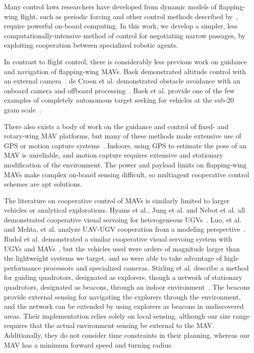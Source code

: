 \documentclass{aamas2013}
\begin{document}
Many control laws researchers have developed from dynamic models of 
flapping-wing flight, such as periodic forcing and other control methods 
described by~\cite{doman:dynamics}\cite{khan:longitudinal_control}\cite{leonard:averaging}, 
require powerful on-board computing. In this work, we develop a simpler, 
less computationally-intensive method of control for negotiating narrow 
passages, by exploiting cooperation between specialized robotic agents.
%

In contrast to flight control, there is considerably less previous work on 
guidance and navigation of flapping-wing MAVs. Baek demonstrated altitude 
control with an external camera~\cite{baek:altitude}. de Croon et al. 
demonstrated obstacle avoidance with an onboard camera and offboard 
processing~\cite{delfly:avoid}. Baek et al. provide one of the few examples 
of completely autonomous target seeking for vehicles at the sub-20 gram 
scale~\cite{baek:tracking}.

There also exists a body of work on the guidance and control of fixed- and 
rotary-wing MAV platforms, but many of these methods make extensive use of 
GPS or motion capture systems~\cite{kanade:3dvision}\cite{kingston:timeattitude}. 
Indoors, using GPS to estimate the pose of an MAV is unreliable, and motion 
capture requires extensive and stationary modification of the environment. 
The power and payload limits on flapping-wing MAVs make complex on-board 
sensing difficult, so multiagent cooperative control schemes are apt 
solutions.

The literature on cooperative control of MAVs is similarly limited to larger
vehicles or analytical explorations. Hyams et al., Jung et al. and Nebot et
al. all demonstrated cooperative visual servoing for heterogeneous
UGVs~\cite{Hyams1999Cooperative}\cite{Jung1998Range}\cite{Nebot2003Agents}.
Luo, et al. and Mehta, et al. analyze UAV-UGV cooperation from a modeling
perspective~\cite{Luo2011Air}\cite{Mehta2006Adaptive}. Rudol et al.
demonstrated a similar cooperative visual servoing system with UGVs and
MAVs~\cite{Rudol2008Micro}, but the vehicles used were orders of magnitude
larger than the lightweight systems we target, and so were able to take
advantage of high-performance processors and specialized cameras. Stirling et
al. describe a method for guiding quadrotors, designated as explorers, though
a network of stationary quadrotors, designated as beacons, through an indoor
environment~\cite{SwarmStirling}. The beacons provide external sensing for
navigating the explorers through the environment, and the network can be
extended by using explorers as beacons in undiscovered areas. Their
implementation relies solely on local sensing, although our size range
requires that the actual environment sensing be external to the MAV. Additionally, they do not consider time constraints in their planning, whereas our MAV has a minimum forward speed and turning radius.
\end{document}
